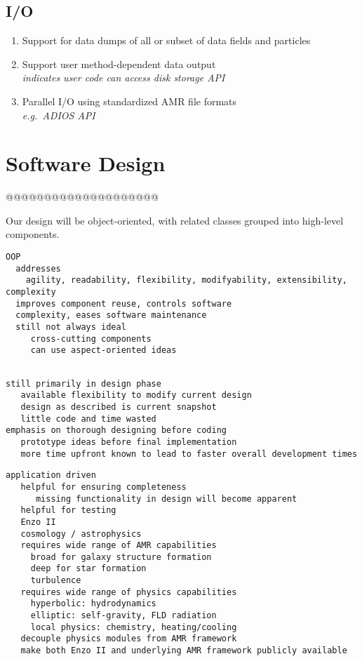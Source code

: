 \documentclass{article}
\begin{document}
\subsection{I/O }

\begin{enumerate}
     \item Support for data dumps of all or subset of data fields and particles
     \item Support user method-dependent data output
       \\ \textit{indicates user code can access disk storage API }
     \item Parallel I/O using standardized AMR file formats \cite{LoKl08}
       \\ \textit{e.g.~ADIOS API }
\end{enumerate}
       
\section{Software Design} \label{s:design}

@@@@@@@@@@@@@@@@@@@@

Our design will be object-oriented, with related classes grouped into
high-level components.

\begin{verbatim}
OOP
  addresses 
    agility, readability, flexibility, modifyability, extensibility, complexity
  improves component reuse, controls software
  complexity, eases software maintenance
  still not always ideal
     cross-cutting components
     can use aspect-oriented ideas
\end{verbatim}

\begin{verbatim}

still primarily in design phase
   available flexibility to modify current design
   design as described is current snapshot
   little code and time wasted
emphasis on thorough designing before coding
   prototype ideas before final implementation
   more time upfront known to lead to faster overall development times
\end{verbatim}

\begin{verbatim}
application driven
   helpful for ensuring completeness
      missing functionality in design will become apparent
   helpful for testing
   Enzo II
   cosmology / astrophysics
   requires wide range of AMR capabilities
     broad for galaxy structure formation
     deep for star formation
     turbulence
   requires wide range of physics capabilities
     hyperbolic: hydrodynamics
     elliptic: self-gravity, FLD radiation
     local physics: chemistry, heating/cooling
   decouple physics modules from AMR framework
   make both Enzo II and underlying AMR framework publicly available
\end{verbatim}
\end{document}
